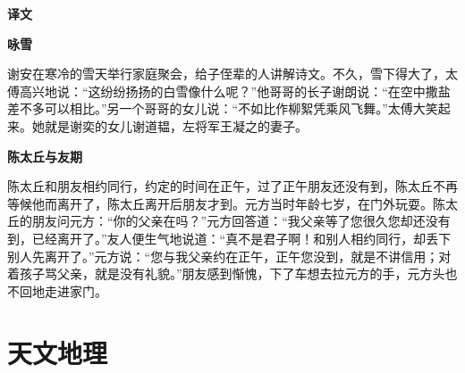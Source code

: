 \documentclass[12pt,UTF-8,openany,a4]{ctexbook}
\begin{document}
\newpage

\begin{Large}
    \noindent\textbf{译文}
\end{Large}


\vspace{1em}

\begin{large}
    \yiwen 
    \begin{center}{\Large\textbf{咏雪}}\end{center}
    
    谢安在寒冷的雪天举行家庭聚会，给子侄辈的人讲解诗文。不久，雪下得大了，太傅高兴地说：“这纷纷扬扬的白雪像什么呢？”他哥哥的长子谢朗说：“在空中撒盐差不多可以相比。”另一个哥哥的女儿说：“不如比作柳絮凭乘风飞舞。”太傅大笑起来。她就是谢奕的女儿谢道韫，左将军王凝之的妻子。
    
    \begin{center}{\Large\textbf{陈太丘与友期}}\end{center}
    
    陈太丘和朋友相约同行，约定的时间在正午，过了正午朋友还没有到，陈太丘不再等候他而离开了，陈太丘离开后朋友才到。元方当时年龄七岁，在门外玩耍。陈太丘的朋友问元方：“你的父亲在吗？”元方回答道：“我父亲等了您很久您却还没有到，已经离开了。”友人便生气地说道：“真不是君子啊！和别人相约同行，却丢下别人先离开了。”元方说：“您与我父亲约在正午，正午您没到，就是不讲信用；对着孩子骂父亲，就是没有礼貌。”朋友感到惭愧，下了车想去拉元方的手，元方头也不回地走进家门。
    
\end{large}



\chapter{天文地理}
\end{document}
